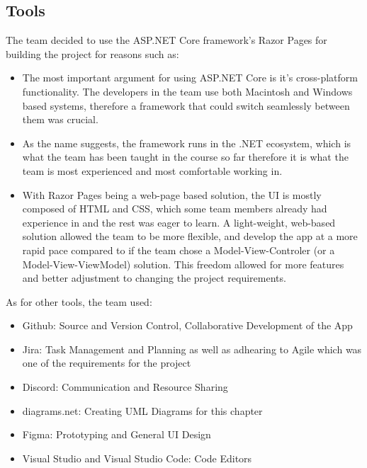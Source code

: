 \documentclass[12pt]{report}
\begin{document}
\subsection*{Tools}
The team decided to use the ASP.NET Core framework's Razor Pages for building the project for reasons such as:
\begin{itemize}
  \item The most important argument for using ASP.NET Core is it's cross-platform functionality. The developers in the team use 
  both Macintosh and Windows based systems, therefore a framework that could switch seamlessly between them was crucial.
  \item As the name suggests, the framework runs in the .NET ecosystem, which is what the team has been taught in the course so far
  therefore it is what the team is most experienced and most comfortable working in.
  \item With Razor Pages being a web-page based solution, the UI is mostly composed of HTML and CSS, which some team members already
  had experience in and the rest was eager to learn. A light-weight, web-based solution allowed the team to be more flexible,
  and develop the app at a more rapid pace compared to if the team chose a Model-View-Controler (or a Model-View-ViewModel) solution.
  This freedom allowed for more features and better adjustment to changing the project requirements.
\end{itemize}
As for other tools, the team used:
\begin{itemize}
  \item Github: Source and Version Control, Collaborative Development of the App
  \item Jira: Task Management and Planning as well as adhearing to Agile which was one of the requirements for the project
  \item Discord: Communication and Resource Sharing
  \item diagrams.net: Creating UML Diagrams for this chapter
  \item Figma: Prototyping and General UI Design
  \item Visual Studio and Visual Studio Code: Code Editors
\end{itemize}
\end{document}
